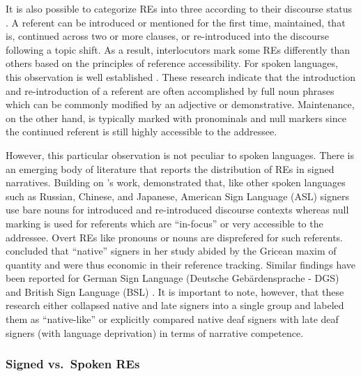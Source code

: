\documentclass[review]{elsarticle} %
\begin{document}
It is also possible to categorize REs into three according to their
discourse status \citep{gullberg2006}. A referent can be introduced or
mentioned for the first time, maintained, that is, continued across two
or more clauses, or re-introduced into the discourse following a topic
shift. As a result, interlocutors mark some REs differently than others
based on the principles of reference accessibility. For spoken
languages, this observation is well established
\citep{ariel1990, givon1983, gundel1993, debreslioska2013, ahrenholz2005, chafe1976, hickmann1996, azar2015}.
These research indicate that the introduction and re-introduction of a
referent are often accomplished by full noun phrases which can be
commonly modified by an adjective or demonstrative. Maintenance, on the
other hand, is typically marked with pronominals and null markers since
the continued referent is still highly accessible to the addressee.

However, this particular observation is not peculiar to spoken
languages. There is an emerging body of literature that reports the
distribution of REs in signed narratives. Building on
\citet{gundel1993}'s work, \citet{swabey2002} demonstrated that, like
other spoken languages such as Russian, Chinese, and Japanese, American
Sign Language (ASL) signers use bare nouns for introduced and
re-introduced discourse contexts whereas null marking is used for
referents which are ``in-focus'' or very accessible to the addressee.
Overt REs like pronouns or nouns are disprefered for such referents.
\citet{swabey2002} concluded that ``native'' signers in her study abided
by the Gricean maxim of quantity and were thus economic in their
reference tracking. Similar findings have been reported for German Sign
Language (Deutsche Gebärdensprache - DGS) \citep{perniss2015} and
British Sign Language (BSL) \citep{morgan2005}. It is important to note,
however, that these research either collapsed native and late signers
into a single group and labeled them as ``native-like'' or explicitly
compared native deaf signers with late deaf signers (with language
deprivation) in terms of narrative competence.

\hypertarget{signed-vs.-spoken-res}{%
\subsubsection{Signed vs.~Spoken REs}\label{signed-vs.-spoken-res}}
\end{document}
